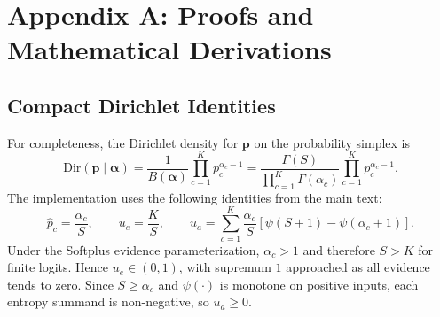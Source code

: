 \documentclass[letterpaper]{article} %
\newcommand{\Dir}{\text{Dir}}
\begin{document}
\appendix

\section{Appendix A: Proofs and Mathematical Derivations}
\label{app:proofs}

\subsection{Compact Dirichlet Identities}
For completeness, the Dirichlet density for $\bm{p}$ on the probability simplex is
\begin{equation}\label{eq:dirichlet_pdf_app}
    \Dir(\bm{p}\mid\bm{\alpha})
    =
    \frac{1}{B(\bm{\alpha})}\prod_{c=1}^{K}p_c^{\alpha_c-1}
    =
    \frac{\Gamma(S)}{\prod_{c=1}^{K}\Gamma(\alpha_c)}
    \prod_{c=1}^{K}p_c^{\alpha_c-1}.
\end{equation}
The implementation uses the following identities from the main text:
\begin{equation}
    \hat{p}_c=\frac{\alpha_c}{S},\qquad
    u_e=\frac{K}{S},\qquad
    u_a=\sum_{c=1}^{K}\frac{\alpha_c}{S}
    \left[\psi(S+1)-\psi(\alpha_c+1)\right].
\end{equation}
Under the Softplus evidence parameterization, $\alpha_c>1$ and therefore $S>K$ for finite logits. Hence $u_e\in(0,1)$, with supremum $1$ approached as all evidence tends to zero. Since $S\ge \alpha_c$ and $\psi(\cdot)$ is monotone on positive inputs, each entropy summand is non-negative, so $u_a\ge0$.
\end{document}
